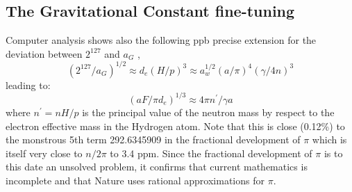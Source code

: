 \documentclass[twoside,draft]{article}
\begin{document}
\begin{sloppypar}
{\subsection {The Gravitational Constant fine-tuning}

Computer analysis shows also the following ppb precise extension for the deviation between $2^{127}$ and
$a_{G}$ ,
\begin{equation}
(2^{127} / a_{G})^{1/2} \approx d_{e} (H/p)^{3} \approx a_{w}^{1/2} (a/\pi)^{4} ( \gamma/4n)^{3}
\end{equation}
leading to:
\begin{equation}
(aF /\pi d_{e})^{1/3} \approx 4\pi n^{\prime}/ \gamma a
\end{equation}
where $n^{\prime} = nH/p$ is the principal value of the neutron mass by respect to the electron effective mass
in the Hydrogen atom. Note that this is close (0.12\%) to the monstrous 5th term 292.6345909 in
the fractional development of $\pi$ which is itself very close to $n/2\pi$ to 3.4 ppm. Since the fractional
development of $\pi$ is to this date an unsolved problem, it confirms that current mathematics is
incomplete and that Nature uses rational approximations for $\pi$.

}
\end{sloppypar}
\end{document}
